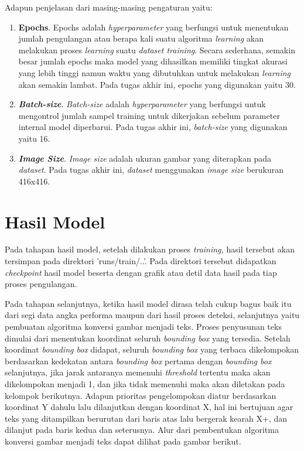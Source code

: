 \noindent Adapun penjelasan dari masing-masing pengaturan yaitu: \par
\begin{enumerate}[nolistsep]
    \item \textbf{Epochs}. Epochs adalah \textit{hyperparameter} yang berfungsi untuk menentukan jumlah pengulangan atau berapa kali suatu algoritma \textit{learning} akan melakukan proses \textit{learning} suatu \textit{dataset training}. Secara sederhana, semakin besar jumlah epochs maka model yang dihasilkan memiliki tingkat akurasi yang lebih tinggi namun waktu yang dibutuhkan untuk melakukan \textit{learning} akan semakin lambat. Pada tugas akhir ini, epochs yang digunakan yaitu 30.
    \item \textit{\textbf{Batch-size}}. \textit{Batch-size} adalah \textit{hyperparameter} yang berfungsi untuk mengontrol jumlah sampel training untuk dikerjakan sebelum parameter internal model diperbarui. Pada tugas akhir ini, \textit{batch-size} yang digunakan yaitu 16.
    \item \textit{\textbf{Image Size}}. \textit{Image size} adalah ukuran gambar yang diterapkan pada \textit{dataset}. Pada tugas akhir ini, \textit{dataset} menggunakan \textit{image size} berukuran 416x416.
\end{enumerate}

\section{Hasil Model}
\label{sec:hasilmodel}

Pada tahapan hasil model, setelah dilakukan proses \textit{training,} hasil tersebut akan tersimpan pada direktori 'runs/train/..'. Pada direktori tersebut didapatkan \textit{checkpoint} hasil model beserta dengan grafik atau detil data hasil pada tiap proses pengulangan. \par

Pada tahapan selanjutnya, ketika hasil model dirasa telah cukup bagus baik itu dari segi data angka performa maupun dari hasil proses deteksi, selanjutnya yaitu pembuatan algoritma konversi gambar menjadi teks. Proses penyusunan teks dimulai dari menentukan koordinat seluruh \textit{bounding box} yang tersedia. Setelah koordinat \textit{bounding box} didapat, seluruh \textit{bounding box} yang terbaca dikelompokan berdasarkan kedekatan antara \textit{bounding box} pertama dengan \textit{bounding box} selanjutnya, jika jarak antaranya memenuhi \textit{threshold} tertentu maka akan dikelompokan menjadi 1, dan jika tidak memenuhi maka akan diletakan pada kelompok berikutnya. Adapun prioritas pengelompokan diatur berdasarkan koordinat Y dahulu lalu dilanjutkan dengan koordinat X, hal ini bertujuan agar teks yang ditampilkan berurutan dari baris atas lalu bergerak kearah X+, dan dilanjut pada baris kedua dan seterusnya. Alur dari pembentukan algoritma konversi gambar menjadi teks dapat dilihat pada gambar berikut. \par
